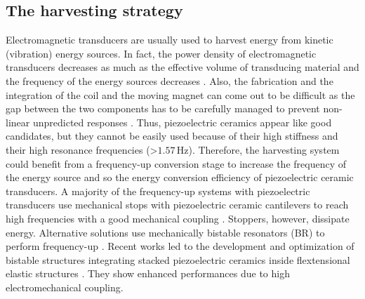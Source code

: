 \documentclass[3p,twocolumn,preprint]{elsarticle}
\begin{document}
	\subsection{The harvesting strategy}	
	\label{The harvesting strategy}
Electromagnetic transducers are usually used to harvest energy from kinetic (vibration) energy sources. In fact, the power density of electromagnetic transducers decreases as much as the effective volume of transducing material and the frequency of the energy sources decreases \cite{Priya2017,Kulah2008}. Also, the fabrication and the integration of the coil and the moving magnet can come out to be difficult as the gap between the two components has to be carefully managed to prevent non-linear unpredicted responses \cite{Caruntu2001}. Thus, piezoelectric ceramics appear like good candidates, but they cannot be easily used because of their high stiffness and their high resonance frequencies (>$1.57$\,Hz). Therefore, the harvesting system could benefit from a frequency-up conversion stage \cite{Ashraf2011,Peng2021} to increase the frequency of the energy source and so the energy conversion efficiency of piezoelectric ceramic transducers. A majority of the frequency-up systems with piezoelectric transducers use mechanical stops with piezoelectric ceramic cantilevers to reach high frequencies with a good mechanical coupling \cite{Edwards2013,Gu2011,Lee2007}. Stoppers, however, dissipate energy. Alternative solutions use mechanically bistable resonators (BR) to perform frequency-up \cite{Vocca2012}. Recent works led to the development and optimization of  bistable structures integrating stacked piezoelectric ceramics inside flextensional elastic structures \cite{Huguet2017}. They show enhanced performances due to high electromechanical coupling.
\end{document}
